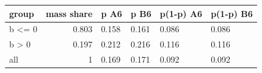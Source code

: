 \begingroup\small
\setlength{\tabcolsep}{3pt}
\renewcommand{\arraystretch}{1.04}
\begin{tabularx}{\linewidth}{XrXXXX}
\toprule
group & mass share & p A6 & p B6 & p(1-p) A6 & p(1-p) B6 \\
\midrule
b \textless{}= 0 & 0.803 & 0.158 & 0.161 & 0.086 & 0.086 \\
b \textgreater{} 0 & 0.197 & 0.212 & 0.216 & 0.116 & 0.116 \\
all & 1 & 0.169 & 0.171 & 0.092 & 0.092 \\
\bottomrule
\end{tabularx}
\endgroup
